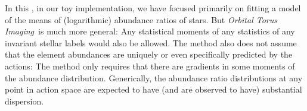 \documentclass[modern]{aastex63}
\newcommand{\methodname}{\textsl{Orbital Torus Imaging}}
\begin{document}
In this \documentname, in our toy implementation, we have focused primarily on
fitting a model of the means of (logarithmic) abundance ratios of stars.
But \methodname\ is much more general:
Any statistical moments of any statistics of any invariant stellar labels would
also be allowed.
The method also does not assume that the element abundances are uniquely or even
specifically predicted by the actions:
The method only requires that there are gradients in some moments of the
abundance distribution.
Generically, the abundance ratio distributions at any point in action space are
expected to have (and are observed to have) substantial dispersion.


\end{document}

